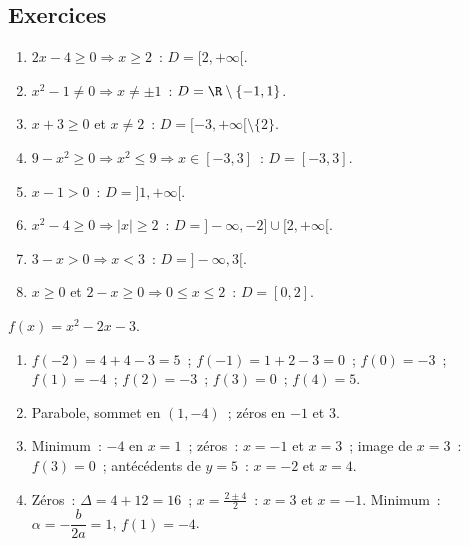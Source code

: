 
\subsection*{Exercices}


\begin{enumerate}
  \item $2x-4\geq0\Rightarrow x\geq2$~: $D=[2,+\infty[$.
  \item $x^2-1\ne0\Rightarrow x\ne\pm1$~: $D=\R\setminus\{-1,1\}$.
  \item $x+3\geq0$ et $x\ne2$~: $D=[-3,+\infty[\setminus\{2\}$.
  \item $9-x^2\geq0\Rightarrow x^2\leq9\Rightarrow x\in[-3,3]$~: $D=[-3,3]$.
  \item $x-1>0$~: $D=]1,+\infty[$.
  \item $x^2-4\geq0\Rightarrow|x|\geq2$~: $D=]-\infty,-2]\cup[2,+\infty[$.
  \item $3-x>0\Rightarrow x<3$~: $D=]-\infty,3[$.
  \item $x\geq0$ et $2-x\geq0\Rightarrow0\leq x\leq2$~: $D=[0,2]$.
\end{enumerate}


$f(x)=x^2-2x-3$.
\begin{enumerate}
  \item $f(-2)=4+4-3=5$~; $f(-1)=1+2-3=0$~; $f(0)=-3$~; $f(1)=-4$~; $f(2)=-3$~;
        $f(3)=0$~; $f(4)=5$.
  \item Parabole, sommet en $(1,-4)$~; z\'eros en $-1$ et $3$.
  \item Minimum~: $-4$ en $x=1$~; z\'eros~: $x=-1$ et $x=3$~;
        image de $x=3$~: $f(3)=0$~; ant\'ec\'edents de $y=5$~: $x=-2$ et $x=4$.
  \item Z\'eros~: $\Delta=4+12=16$~; $x=\frac{2\pm4}{2}$~: $x=3$ et $x=-1$.\checkmark
        Minimum~: $\alpha=-\dfrac{b}{2a}=1$, $f(1)=-4$.\checkmark
\end{enumerate}


